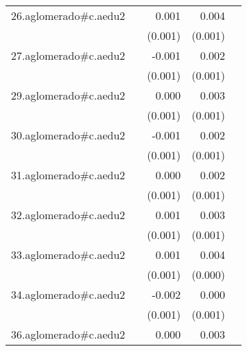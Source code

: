 {\begin{longtable}{l*{4}{D{.}{.}{-1}}}
\addlinespace
26.aglomerado#c.aedu2&                     &       0.001         &       0.004\sym{***}&                     \\
            &                     &     (0.001)         &     (0.001)         &                     \\
\addlinespace
27.aglomerado#c.aedu2&                     &      -0.001         &       0.002\sym{**} &                     \\
            &                     &     (0.001)         &     (0.001)         &                     \\
\addlinespace
29.aglomerado#c.aedu2&                     &       0.000         &       0.003\sym{***}&                     \\
            &                     &     (0.001)         &     (0.001)         &                     \\
\addlinespace
30.aglomerado#c.aedu2&                     &      -0.001         &       0.002\sym{*}  &                     \\
            &                     &     (0.001)         &     (0.001)         &                     \\
\addlinespace
31.aglomerado#c.aedu2&                     &       0.000         &       0.002         &                     \\
            &                     &     (0.001)         &     (0.001)         &                     \\
\addlinespace
32.aglomerado#c.aedu2&                     &       0.001         &       0.003\sym{***}&                     \\
            &                     &     (0.001)         &     (0.001)         &                     \\
\addlinespace
33.aglomerado#c.aedu2&                     &       0.001         &       0.004\sym{***}&                     \\
            &                     &     (0.001)         &     (0.000)         &                     \\
\addlinespace
34.aglomerado#c.aedu2&                     &      -0.002         &       0.000         &                     \\
            &                     &     (0.001)         &     (0.001)         &                     \\
\addlinespace
36.aglomerado#c.aedu2&                     &       0.000         &       0.003\sym{***}&                     \\

\end{longtable}}
